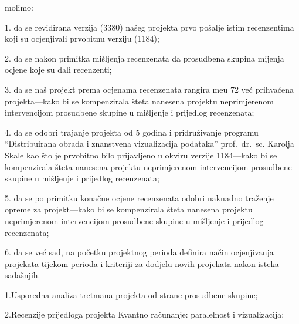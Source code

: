 \smallskip\rm

molimo:

\parindent=40pt
\ssb
\smallskip
\item{1.} da se revidirana verzija (3380) na\v seg projekta prvo 
po\v salje istim recenzentima koji su ocjenjivali prvobitnu 
verziju (1184);

\ssb
\smallskip
\item{2.} da se nakon primitka mi\v sljenja recenzenata 
 da prosudbena skupina mijenja ocjene koje 
su dali recenzenti;  

\ssb
\smallskip
\item{3.} da se na\v s projekt prema ocjenama recenzenata 
rangira me\dj u 72 ve\'c prihva\'cena projekta---kako bi se 
kompenzirala \v steta nanesena projektu neprimjerenom intervencijom 
prosudbene skupine u mi\v sljenje i prijedlog recenzenata; 

\ssb
\smallskip
\item{4.} da se odobri trajanje projekta od 5 godina i pridru\v zivanje
programu ``Distribuirana obrada i znanstvena vizualizacija podataka'' 
prof.~dr.~sc. Karolja Skale kao \v sto je prvobitno bilo prijavljeno u okviru 
verzije 1184---kako bi se kompenzirala \v steta nanesena projektu 
neprimjerenom intervencijom prosudbene skupine u mi\v sljenje i 
prijedlog recenzenata; 

\ssb
\smallskip
\item{5.} da se po primitku kona\v cne ocjene recenzenata 
odobri naknadno tra\v zenje opreme za projekt---kako bi se 
kompenzirala \v steta nanesena projektu neprimjerenom intervencijom 
prosudbene skupine u mi\v sljenje i prijedlog recenzenata;


\ssb
\smallskip
\item{6.} da se ve\'c sad, na po\v cetku projektnog perioda definira
na\v cin ocjenjivanja projekata tijekom perioda i kriteriji za 
dodjelu novih projekata nakon isteka sada\v snjih.   

\rm
\bigskip\bigskip\bigskip\bigskip\bigskip\bigskip

\medskip 
{}

\parindent=0pt   
\sss
{}

\parindent=20pt   
\medskip
\item{1.}Usporedna analiza tretmana projekta od strane prosudbene 
skupine;

\smallskip
\item{2.}Recenzije prijedloga projekta \ssi Kvantno ra\v cunanje: 
paralelnost i vizualizacija\sss;


